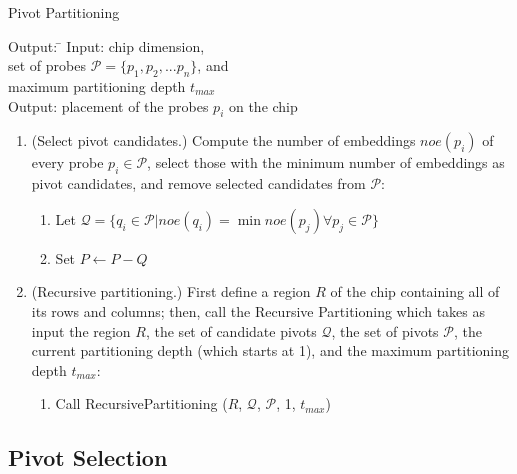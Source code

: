 \documentclass{llncs}
\begin{document}
\begin{algorithm}
\caption{Pivot Partitioning}
\label{alg:pivotpart}
\begin{minipage}{4.8in}

\begin{tabbing}
Output: \=									\kill
Input:  \> chip dimension,							\\
        \> set of probes $\mathcal{P} = \{p_{1}, p_{2}, ... p_{n}\}$, and	\\
        \> maximum partitioning depth $t_{max}$					\\
Output: \> placement of the probes $p_i$ on the chip
\end{tabbing}

\begin{enumerate}
\item (Select pivot candidates.) Compute the number of embeddings $noe(p_i)$
of every probe $p_i \in \mathcal{P}$, select those with the minimum number
of embeddings as pivot candidates, and remove selected candidates from
$\mathcal{P}$:
  \begin{enumerate}
  \item Let $\mathcal{Q} = \{q_i \in \mathcal{P} | noe(q_i) = \min noe(p_j) \forall p_j \in \mathcal{P} \}$
  \item Set $P \leftarrow P - Q$
  \end{enumerate}
\item (Recursive partitioning.) First define a region $R$ of the chip containing
all of its rows and columns; then, call the Recursive Partitioning which takes as
input the region $R$, the set of candidate pivots $\mathcal{Q}$, the set of pivots
$\mathcal{P}$, the current partitioning depth (which starts at 1), and the
maximum partitioning depth $t_{max}$:
  \begin{enumerate}
  \item Call RecursivePartitioning ($R$, $\mathcal{Q}$, $\mathcal{P}$, 1, $t_{max}$)
  \end{enumerate}
\end{enumerate}

\end{minipage}
\end{algorithm}

\subsection{Pivot Selection}
\end{document}
